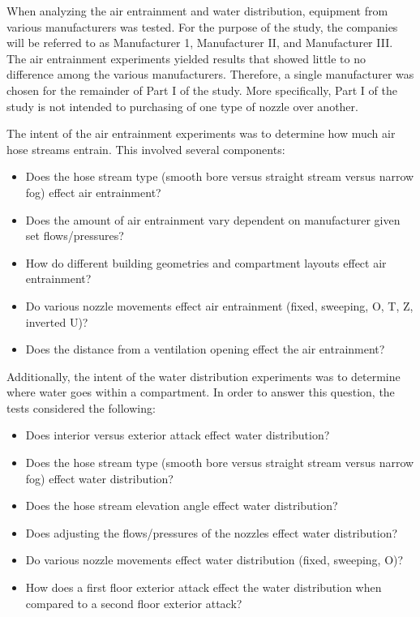\documentclass{article}
\begin{document}
When analyzing the air entrainment and water distribution, equipment from various manufacturers was tested. For the purpose of the study, the companies will be referred to as Manufacturer 1, Manufacturer II, and Manufacturer III. The air entrainment experiments yielded results that showed little to no difference among the various manufacturers. Therefore, a single manufacturer was chosen for the remainder of Part I of the study. More specifically, Part I of the study is not intended to purchasing of one type of nozzle over another.

The intent of the air entrainment experiments was to determine how much air hose streams entrain. This involved several components:

\begin{itemize}
	\item Does the hose stream type (smooth bore versus straight stream versus narrow fog) effect air entrainment?
	\item Does the amount of air entrainment vary dependent on manufacturer given set flows/pressures?
	\item How do different building geometries and compartment layouts effect air entrainment?
	\item Do various nozzle movements effect air entrainment (fixed, sweeping, O, T, Z, inverted U)?
	\item Does the distance from a ventilation opening effect the air entrainment?

\end{itemize}

Additionally, the intent of the water distribution experiments was to determine where water goes within a compartment. In order to answer this question, the tests considered the following:

\begin{itemize}
	\item Does interior versus exterior attack effect water distribution?
	\item Does the hose stream type (smooth bore versus straight stream versus narrow fog) effect water distribution? 
	\item Does the hose stream elevation angle effect water distribution?
	\item Does adjusting the flows/pressures of the nozzles effect water distribution? 
	\item Do various nozzle movements effect water distribution (fixed, sweeping, O)?
	\item How does a first floor exterior attack effect the water distribution when compared to a second floor exterior attack?
\end{itemize}
\end{document}
